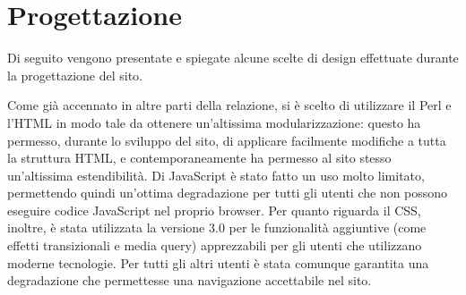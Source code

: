 \section{Progettazione}

Di seguito vengono presentate e spiegate alcune scelte di design effettuate durante la progettazione del sito.


Come già accennato in altre parti della relazione, si è scelto di utilizzare il Perl e l'HTML in modo tale da ottenere un'altissima modularizzazione: questo ha permesso, durante lo sviluppo del sito, di applicare facilmente modifiche a tutta la struttura HTML, e contemporaneamente ha permesso al sito stesso un'altissima estendibilità. Di JavaScript \`e stato fatto un uso molto limitato, permettendo quindi un'ottima degradazione per tutti gli utenti che non possono eseguire codice JavaScript nel proprio browser. Per quanto riguarda il CSS, inoltre, è stata utilizzata la versione 3.0 per le funzionalità aggiuntive (come effetti transizionali e media query) apprezzabili per gli utenti che utilizzano moderne tecnologie. Per tutti gli altri utenti è stata comunque garantita una degradazione che permettesse una navigazione accettabile nel sito.
